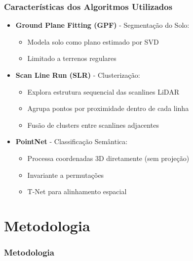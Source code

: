 \documentclass[aspectratio=169,t,xcolor=table]{beamer}
\begin{document}
\begin{frame}
    \frametitle{Características dos Algoritmos Utilizados}
    \begin{itemize}
        \item<+-> \textbf{Ground Plane Fitting (GPF)} - Segmentação do Solo:
              \begin{itemize}
                  \item<+-> Modela solo como plano estimado por SVD
                  \item<+-> Limitado a terrenos regulares
              \end{itemize}
        \item<+-> \textbf{Scan Line Run (SLR)} - Clusterização:
              \begin{itemize}
                  \item<+-> Explora estrutura sequencial das scanlines LiDAR
                  \item<+-> Agrupa pontos por proximidade dentro de cada linha
                  \item<+-> Fusão de clusters entre scanlines adjacentes
              \end{itemize}
        \item<+-> \textbf{PointNet} - Classificação Semântica:
              \begin{itemize}
                  \item<+-> Processa coordenadas 3D diretamente (sem projeção)
                  \item<+-> Invariante a permutações
                  \item<+-> T-Net para alinhamento espacial
              \end{itemize}
    \end{itemize}
\end{frame}

\section{Metodologia}

\begin{frame}
    \frametitle{Metodologia}
\end{frame}
\end{document}
